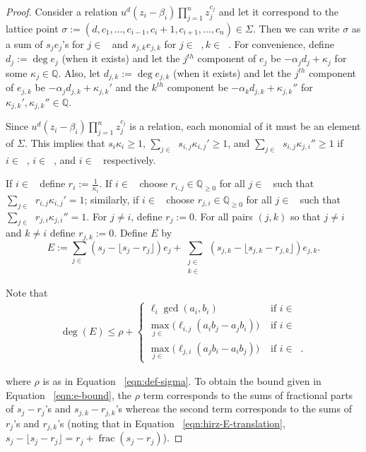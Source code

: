 \documentclass{amsart}
\theoremstyle{plain}
\theoremstyle{definition}
\theoremstyle{remark}
\numberwithin{equation}{section}
\newcommand\bq{{\mathbb Q}}
\newcommand\bida{a}
\newcommand\bidb{b}
\DeclareMathOperator{\fr}{frac}
\DeclareMathOperator{\Te}{T_=}
\DeclareMathOperator{\Tp}{T_+}
\DeclareMathOperator{\Tm}{T_-}
\begin{document}
\begin{proof}
Consider a relation $u^d(z_i - \beta_i)\prod_{j=1}^n z_j^{c_j}$ and
let it correspond to the lattice point $\sigma := (d, c_1, \ldots,
c_{i-1}, c_{i}+1, c_{i+1}, \ldots, c_n) \in \Sigma$.
Then we can write $\sigma$ as a sum of $s_j e_j$'s for $j\in
\Te$ and $s_{j,k}e_{j,k}$ for $j\in \Tp, k\in \Tm$.  
For convenience, define $d_j := \deg e_j$ (when it exists) and let the $j^{th}$
component of $e_j$ be $-\alpha_j d_j + \kappa_j$ for some $\kappa_j \in \bq$. Also, let $d_{j,k} := \deg e_{j,k}$ (when it exists) and let the $j^{th}$ component of $e_{j,k}$ be $-\alpha_j d_{j,k} + \kappa_{j,k}'$ and the $k^{th}$
component be $-\alpha_k d_{j,k} + \kappa_{j,k}''$ for $\kappa_{j,k}', \kappa_{j,k}'' \in \bq$.

Since $u^d (z_i - \beta_i)\prod_{j=1}^n z_j^{c_j}$ is a relation, each monomial of it must be an element of $\Sigma$. This implies that $s_i\kappa_i\ge 1$, $\sum_{j\in \Tm} s_{i,j}\kappa_{i,j}' \ge 1$, and $\sum_{j\in \Tp} s_{i,j}\kappa_{j,i}'' \ge 1$ if $i\in \Te$, $i\in \Tp$, and $i\in \Tm$ respectively.

If $i\in \Te$ define $r_i := \frac{1}{\kappa_i}$.  If $i\in \Tp$ choose $r_{i,j}\in \bq_{\ge 0}$ for all $j\in \Tm$ such that $\sum_{j\in \Tm} r_{i,j}\kappa_{i,j}' = 1$; similarly, if $i\in \Tm$ choose $r_{j,i}\in \bq_{\ge 0}$ for all $j\in \Tp$ such that $\sum_{j\in \Tm} r_{j,i}\kappa_{j,i}'' = 1$.  For $j\ne i$, define $r_j := 0.$ For all pairs $(j,k)$ so that $j \neq i$ and $k \neq i$ define $r_{j,k} := 0$.
Define $E$ by
\begin{equation}\label{eqn:hirz-E-translation}
	E := \sum_{j\in \Te} (s_j - \lfloor s_j - r_j \rfloor) e_j + \sum_{\substack{j \in 
	\Tp \\ k \in \Tm}} (s_{j,k} - \lfloor s_{j,k} - r_{j,k} \rfloor) e_{j,k}.
\end{equation}


Note that
\begin{align}
\label{eqn:e-bound}
	\deg(E) \le \rho + \begin{cases}
	\ell_i \gcd(\bida_i, \bidb_i)	&\mbox{ if } i \in \Te \\
	\max_{j \in \Tm} \bigl(\ell_{i, j} (\bida_i \bidb_j - \bida_j \bidb_i)\bigr)
	&\mbox{ if } i \in \Tp \\
	\max_{j \in \Tp} \bigl(\ell_{j, i} (\bida_j \bidb_ i - \bida_i \bidb_j) \bigr)
	&\mbox{ if } i \in \Tm. \end{cases}
\end{align}

\noindent
where $\rho$ is as in Equation ~\eqref{eqn:def-sigma}. To obtain the
bound given in Equation ~\eqref{eqn:e-bound}, the $\rho$ term 
corresponds to the sums of fractional parts of $s_j - r_j$'s and $s_
{j, k} - r_{j, k}$'s whereas the second term corresponds to the sums 
of $r_j$'s and $r_{j, k}$'s (noting that in Equation
~\ref{eqn:hirz-E-translation}, $s_j - \lfloor s_j - r_j \rfloor =
r_j + \fr(s_j - r_j)$).


\end{proof}
\end{document}
